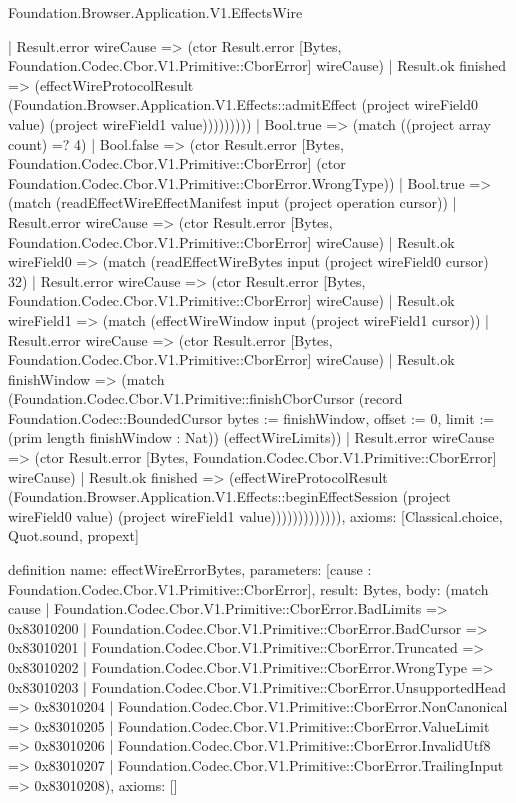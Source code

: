 \begin{lexlean}{Foundation.Browser.Application.V1.EffectsWire}
\begin{semanticmodule}
{                        | Result.error wireCause => (ctor Result.error [Bytes, Foundation.Codec.Cbor.V1.Primitive::CborError] wireCause)
                        | Result.ok finished => (effectWireProtocolResult (Foundation.Browser.Application.V1.Effects::admitEffect (project wireField0 value) (project wireField1 value)))))))))
            | Bool.true => (match ((project array count) =? 4)
              | Bool.false => (ctor Result.error [Bytes, Foundation.Codec.Cbor.V1.Primitive::CborError] (ctor Foundation.Codec.Cbor.V1.Primitive::CborError.WrongType))
              | Bool.true => (match (readEffectWireEffectManifest input (project operation cursor))
                | Result.error wireCause => (ctor Result.error [Bytes, Foundation.Codec.Cbor.V1.Primitive::CborError] wireCause)
                | Result.ok wireField0 => (match (readEffectWireBytes input (project wireField0 cursor) 32)
                  | Result.error wireCause => (ctor Result.error [Bytes, Foundation.Codec.Cbor.V1.Primitive::CborError] wireCause)
                  | Result.ok wireField1 => (match (effectWireWindow input (project wireField1 cursor))
                    | Result.error wireCause => (ctor Result.error [Bytes, Foundation.Codec.Cbor.V1.Primitive::CborError] wireCause)
                    | Result.ok finishWindow => (match (Foundation.Codec.Cbor.V1.Primitive::finishCborCursor (record Foundation.Codec::BoundedCursor {bytes := finishWindow, offset := 0, limit := (prim length finishWindow : Nat)}) (effectWireLimits))
                      | Result.error wireCause => (ctor Result.error [Bytes, Foundation.Codec.Cbor.V1.Primitive::CborError] wireCause)
                      | Result.ok finished => (effectWireProtocolResult (Foundation.Browser.Application.V1.Effects::beginEffectSession (project wireField0 value) (project wireField1 value))))))))))))),
  axioms: [Classical.choice, Quot.sound, propext]
}

definition{
  name: effectWireErrorBytes,
  parameters: [cause : Foundation.Codec.Cbor.V1.Primitive::CborError],
  result: Bytes,
  body: (match cause
    | Foundation.Codec.Cbor.V1.Primitive::CborError.BadLimits => 0x83010200
    | Foundation.Codec.Cbor.V1.Primitive::CborError.BadCursor => 0x83010201
    | Foundation.Codec.Cbor.V1.Primitive::CborError.Truncated => 0x83010202
    | Foundation.Codec.Cbor.V1.Primitive::CborError.WrongType => 0x83010203
    | Foundation.Codec.Cbor.V1.Primitive::CborError.UnsupportedHead => 0x83010204
    | Foundation.Codec.Cbor.V1.Primitive::CborError.NonCanonical => 0x83010205
    | Foundation.Codec.Cbor.V1.Primitive::CborError.ValueLimit => 0x83010206
    | Foundation.Codec.Cbor.V1.Primitive::CborError.InvalidUtf8 => 0x83010207
    | Foundation.Codec.Cbor.V1.Primitive::CborError.TrailingInput => 0x83010208),
  axioms: []
}


\end{semanticmodule}
\end{lexlean}
